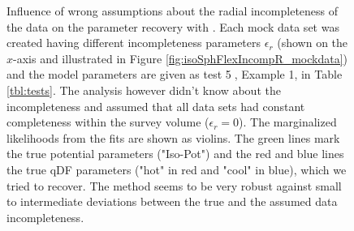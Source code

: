 \addtocounter{figure}{-1}
\begin{figure} [t!]
\caption{Influence of wrong assumptions about the radial incompleteness of the data on the parameter recovery with \RM. Each mock data set was created having different incompleteness parameters $\epsilon_r$ (shown on the $x$-axis and illustrated in Figure \ref{fig:isoSphFlexIncompR_mockdata}) and the model parameters are given as test \textcircled{5}, Example 1, in Table \ref{tbl:tests}. The analysis however didn't know about the incompleteness and assumed that all data sets had constant completeness within the survey volume ($\epsilon_r = 0$). The marginalized likelihoods from the fits are shown as violins. The green lines mark the true potential parameters ("Iso-Pot") and the red and blue lines the true qDF parameters ("hot" \MAP in red and "cool" \MAP in blue), which we tried to recover. The \RM method seems to be very robust against small to intermediate deviations between the true and the assumed data incompleteness.} 
\label{fig:isoSphFlexIncompR_violins}
\end{figure}

